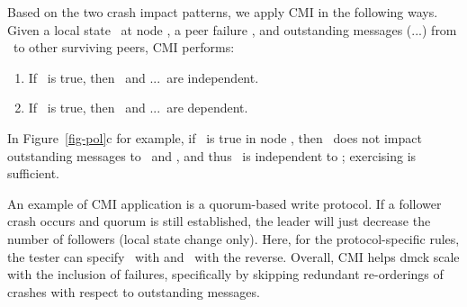 Based on the two crash impact patterns, we apply CMI in the following ways.
%
Given a local state \ls\ at node \nn, a peer failure \xx, and outstanding
messages (\mone...\mn) from \nn\ to other surviving peers, CMI performs:
\begin{enumerate}
\item If \pl\ is true, then \xx\ and \mone...\mn\ are independent.
%
\item If \pg\ is true, then \xx\ and \mone...\mn\ are dependent.
\end{enumerate}
In Figure~\ref{fig-pol}c for example, if \pl\ is true in node ,
then \xx\ does not impact outstanding messages to \fone\ and \ftwo,
and thus \xx\ is independent to ; exercising
 is sufficient.


An example of CMI application is a quorum-based write protocol.  If a
follower crash occurs and quorum is still established, the leader will
just decrease the number of followers (local state change only).  Here,
for the protocol-specific rules, the tester can specify \pl\ with
 \ts{>=}  and \pg\ with the reverse. 
Overall, CMI helps dmck scale with the inclusion of failures, specifically by
skipping redundant re-orderings of crashes with respect to outstanding
messages.

